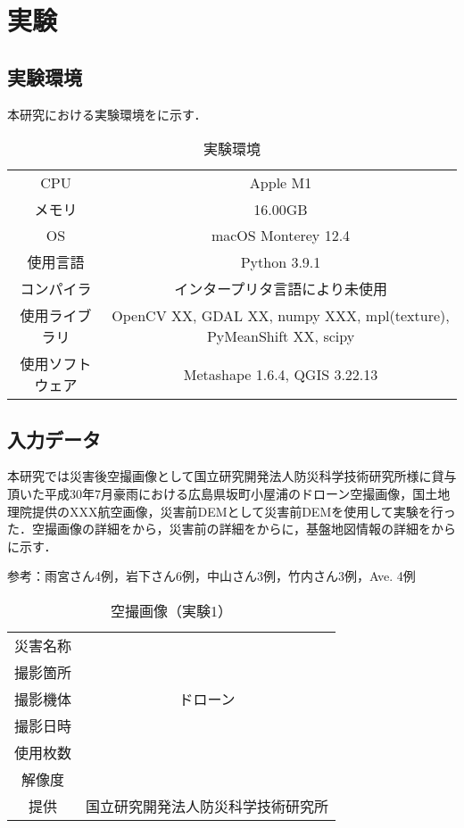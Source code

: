 \chapter{実験}
  \section{実験環境}
    本研究における実験環境をに示す．

    \begin{table}[b]
      \centering
      \caption{実験環境}
      \label{実験環境}
      \begin{tabular}{cc}
        \hline
        CPU & Apple M1 \\
        メモリ & 16.00GB \\
        OS & macOS Monterey 12.4 \\
        使用言語 & Python 3.9.1 \\
        コンパイラ & インタープリタ言語により未使用 \\
        使用ライブラリ & OpenCV XX, GDAL XX, numpy XXX, mpl(texture), PyMeanShift XX, scipy \\ 
        使用ソフトウェア & Metashape 1.6.4, QGIS 3.22.13 \\ \hline 
      \end{tabular}
    \end{table}


  \section{入力データ}
    本研究では災害後空撮画像として国立研究開発法人防災科学技術研究所様に貸与頂いた平成30年7月豪雨における広島県坂町小屋浦のドローン空撮画像\cite{}，国土地理院提供のXXX航空画像，災害前DEMとして災害前DEMを使用して実験を行った．空撮画像の詳細をから，災害前の詳細をからに，基盤地図情報の詳細をからに示す．

    参考：雨宮さん4例，岩下さん6例，中山さん3例，竹内さん3例，Ave. 4例

    \begin{table}[b]
      \centering
      \caption{空撮画像（実験1）}
      \label{空撮画像1}
      \begin{tabular}{cc}
        \hline
        災害名称 &  \\
        撮影箇所 &  \\
        撮影機体 & ドローン \\
        撮影日時 &  \\
        使用枚数 & \\
        解像度 &  \\
        提供 & 国立研究開発法人防災科学技術研究所 \\ \hline
      \end{tabular}
    \end{table}

